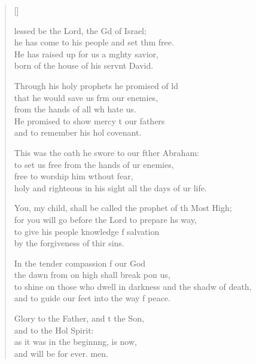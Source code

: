 \settowidth{\versewidth}{to shine on those who dwell in darkness and the shadow of death, *}
\begin{verse}[\versewidth]
  \begin{patverse}
lessed be the Lord, the Gd of Israel;\Med\\
he has come to his people and set thm free.\\
He has raised up for us a m\pointup{\i}ghty savior,\Med\\
born of the house of his servnt David.

Through his holy prophets he promised of ld\Flex\\
that he would save us frm our enemies,\Med\\
from the hands of all wh hate us.\\
He promised to show mercy t our fathers\Med\\
and to remember his hol covenant.

This was the oath he swore to our fther Abraham:\Med\\
to set us free from the hands of ur enemies,\\
free to worship him w\pointup{\i}thout fear,\Med\\
holy and righteous in his sight all the days of ur life.

You, my child, shall be called the prophet of th Most High;\Med\\
for you will go before the Lord to prepare h\pointup{\i}s way,\\
to give his people knowledge f salvation\Med\\
by the forgiveness of thir sins.

In the tender compassion f our God\Med\\
the dawn from on high shall break pon us,\\
to shine on those who dwell in darkness and the shadw of death,\Med\\
and to guide our feet into the way f peace.

Glory to the Father, and t the Son,\Med\\
and to the Hol Spirit:\\
as it was in the beginn\pointup{\i}ng, is now,\Med\\
and will be for ever. men.
  \end{patverse}
  \end{verse}
